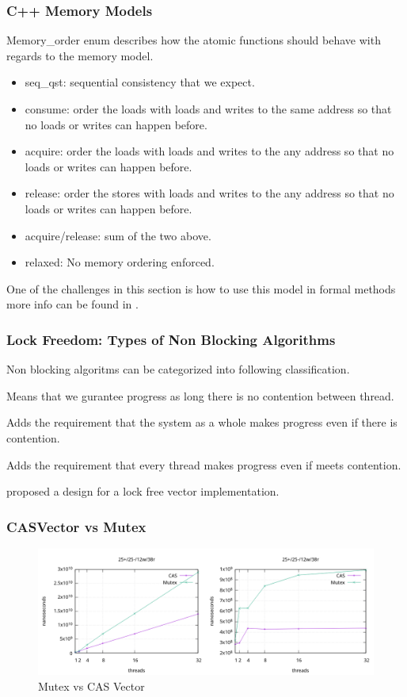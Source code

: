 \documentclass{beamer}
\begin{document}
\begin{frame}
    \frametitle{C++ Memory Models}
    Memory\_order enum describes how the atomic functions should behave with
    regards to the memory model.
    \begin{itemize}
        \item seq\_qst: sequential consistency that we expect.
        \item consume: order the loads with loads and writes to the
            same address so that no loads or writes can happen before.
        \item acquire: order the loads with loads and writes to the
            any address so that no loads or writes can happen before.
        \item release: order the stores with loads and writes to the
            any address so that no loads or writes can happen before.
        \item acquire/release: sum of the two above.
        \item relaxed: No memory ordering enforced.
    \end{itemize}
    One of the challenges in this section is how to use this model in formal
    methods more info can be found in  \cite{mckenney2017parallel}.
\end{frame}

\begin{frame}
    \frametitle{Lock Freedom: Types of Non Blocking Algorithms}
    Non blocking algoritms can be categorized into following classification.
    \begin{description}
        \item[Obstruction Freedom] Means that we gurantee progress as long
            there is no contention between thread.
        \item[Lock Freedom] Adds the requirement that the system as a whole
            makes progress even if there is contention.
        \item[Wait Freedom] Adds the requirement that every thread makes
            progress even if meets contention.
    \end{description}
    \cite{dechev2006lock} proposed a design for a lock free vector
    implementation. \\
\end{frame}

\begin{frame}
    \frametitle{CASVector vs Mutex}
    \begin{figure}
        \centering
        \includegraphics[width=1.0\textwidth]{res.png}
        \caption{Mutex vs CAS Vector}
        \label{fig:res}
    \end{figure}
\end{frame}
\end{document}
